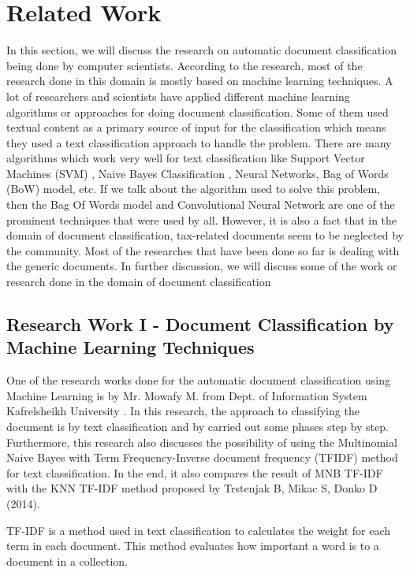 \section{Related Work}
In this section, we will discuss the research on automatic document classification being done by computer scientists. According to the research, most of the research done in this domain is mostly based on machine learning techniques. A lot of researchers and scientists have applied different machine learning algorithms or approaches for doing document classification. Some of them used textual content as a primary source of input for the classification which means they used a text classification approach to handle the problem. There are many algorithms which work very well for text classification like Support Vector Machines (SVM) \cite{svm}, Naive Bayes Classification \cite{nbc}, Neural Networks, Bag of Words (BoW) model, etc. If we talk about the algorithm used to solve this problem, then the Bag Of Words model and Convolutional Neural Network are one of the prominent techniques that were used by all. However, it is also a fact that in the domain of document classification, tax-related documents seem to be neglected by the community. Most of the researches that have been done so far is dealing with the generic documents. In further discussion, we will discuss some of the work or research done in the domain of document classification
\par
\subsection{Research Work I - Document Classification by Machine Learning Techniques}
One of the research works done for the automatic document classification using Machine Learning is by Mr. Mowafy M. from Dept. of Information System Kafrelsheikh University \cite{rw1}. In this research, the approach to classifying the document is by text classification and by carried out some phases step by step. Furthermore, this research also discusses the possibility of using the Multinomial Naive Bayes with Term Frequency-Inverse document frequency (TFIDF) \cite{tfidf} method for text classification. In the end, it also compares the result of MNB TF-IDF with the KNN \cite{knn} TF-IDF method proposed by Trstenjak B, Mikac S, Donko D (2014).
\par
TF-IDF is a method used in text classification to calculates the weight for each term in each document. This method evaluates how important a word is to a document in a collection.
\par
